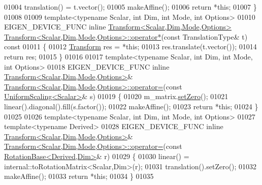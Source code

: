 \begin{DoxyCode}
01004   translation() = t.vector();
01005   makeAffine();
01006   \textcolor{keywordflow}{return} *\textcolor{keyword}{this};
01007 \}
01008 
01009 \textcolor{keyword}{template}<\textcolor{keyword}{typename} Scalar, \textcolor{keywordtype}{int} Dim, \textcolor{keywordtype}{int} Mode, \textcolor{keywordtype}{int} Options>
01010 EIGEN\_DEVICE\_FUNC \textcolor{keyword}{inline} \hyperlink{group___geometry___module_class_eigen_1_1_transform}{Transform<Scalar,Dim,Mode,Options>} 
      \hyperlink{group___geometry___module_a4e44db730819ead6e555cf325cea3fd6}{Transform<Scalar,Dim,Mode,Options>::operator*}(\textcolor{keyword}{const} 
      TranslationType& t)\textcolor{keyword}{ const}
01011 \textcolor{keyword}{}\{
01012   \hyperlink{group___geometry___module_class_eigen_1_1_transform}{Transform} res = *\textcolor{keyword}{this};
01013   res.translate(t.vector());
01014   \textcolor{keywordflow}{return} res;
01015 \}
01016 
01017 \textcolor{keyword}{template}<\textcolor{keyword}{typename} Scalar, \textcolor{keywordtype}{int} Dim, \textcolor{keywordtype}{int} Mode, \textcolor{keywordtype}{int} Options>
01018 EIGEN\_DEVICE\_FUNC \textcolor{keyword}{inline} \hyperlink{group___geometry___module_class_eigen_1_1_transform}{Transform<Scalar,Dim,Mode,Options>}& 
      \hyperlink{group___geometry___module_class_eigen_1_1_transform}{Transform<Scalar,Dim,Mode,Options>::operator=}(\textcolor{keyword}{const} 
      \hyperlink{class_eigen_1_1_uniform_scaling}{UniformScaling<Scalar>}& s)
01019 \{
01020   m\_matrix.\hyperlink{class_eigen_1_1_plain_object_base_ac21ad5f989f320e46958b75ac8d9a1da}{setZero}();
01021   linear().diagonal().fill(s.factor());
01022   makeAffine();
01023   \textcolor{keywordflow}{return} *\textcolor{keyword}{this};
01024 \}
01025 
01026 \textcolor{keyword}{template}<\textcolor{keyword}{typename} Scalar, \textcolor{keywordtype}{int} Dim, \textcolor{keywordtype}{int} Mode, \textcolor{keywordtype}{int} Options>
01027 \textcolor{keyword}{template}<\textcolor{keyword}{typename} Derived>
01028 EIGEN\_DEVICE\_FUNC \textcolor{keyword}{inline} \hyperlink{group___geometry___module_class_eigen_1_1_transform}{Transform<Scalar,Dim,Mode,Options>}& 
      \hyperlink{group___geometry___module_class_eigen_1_1_transform}{Transform<Scalar,Dim,Mode,Options>::operator=}(\textcolor{keyword}{const} 
      \hyperlink{class_eigen_1_1_rotation_base}{RotationBase<Derived,Dim>}& r)
01029 \{
01030   linear() = internal::toRotationMatrix<Scalar,Dim>(r);
01031   translation().setZero();
01032   makeAffine();
01033   \textcolor{keywordflow}{return} *\textcolor{keyword}{this};
01034 \}
01035 

\end{DoxyCode}

